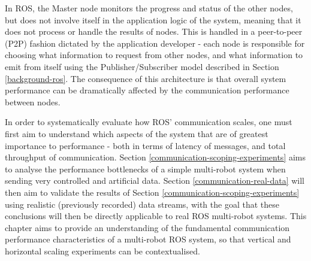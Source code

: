 \documentclass{l4proj}
\begin{document}
In ROS, the Master node monitors the progress and status of the other nodes, but does not involve itself in the application logic of the system, meaning that it does not process or handle the results of nodes. This is handled in a peer-to-peer (P2P) fashion dictated by the application developer - each node is responsible for choosing what information to request from other nodes, and what information to emit from itself using the Publisher/Subscriber model described in Section \ref{background-ros}. The consequence of this architecture is that overall system performance can be dramatically affected by the communication performance between nodes.

In order to systematically evaluate how ROS' communication scales, one must first aim to understand which aspects of the system that are of greatest importance to performance - both in terms of latency of messages, and total throughput of communication. Section \ref{communication-scoping-experiments} aims to analyse the performance bottlenecks of a simple multi-robot system when sending very controlled and artificial data. Section \ref{communication-real-data} will then aim to validate the results of Section \ref{communication-scoping-experiments} using realistic (previously recorded) data streams, with the goal that these conclusions will then be directly applicable to real ROS multi-robot systems. This chapter aims to provide an understanding of the fundamental communication performance characteristics of a multi-robot ROS system, so that vertical and horizontal scaling experiments can be contextualised.
\end{document}
